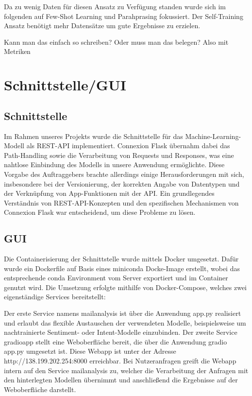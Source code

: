 Da zu wenig Daten für diesen Ansatz zu Verfügung standen wurde sich im folgenden auf Few-Shot
Learning und Parahprasing fokussiert. Der Self-Training Ansatz benötigt mehr Datensätze um
gute Ergebnisse zu erzielen.  

 

Kann man das einfach so schreiben? Oder muss man das belegen? Also mit Metriken 



\section{Schnittstelle/GUI}

\subsection{Schnittstelle}

Im Rahmen unseres Projekts wurde die Schnittstelle für das Machine-Learning-Modell als REST-API implementiert.
Connexion Flask übernahm dabei das Path-Handling sowie die Verarbeitung von Requests und Responses, was eine
nahtlose Einbindung des Modells in unsere Anwendung ermöglichte. Diese Vorgabe des Auftraggebers brachte
allerdings einige Herausforderungen mit sich, insbesondere bei der Versionierung, der korrekten Angabe
von Datentypen und der Verknüpfung von App-Funktionen mit der API. Ein grundlegendes Verständnis von
REST-API-Konzepten und den spezifischen Mechanismen von Connexion Flask war entscheidend, um diese Probleme
zu lösen. 

\subsection{GUI}

Die Containerisierung der Schnittstelle wurde mittels Docker umgesetzt. Dafür wurde ein
Dockerfile auf Basis eines miniconda Docke-Image erstellt, wobei das entsprechende conda
Environment vom Server exportiert und im Container genutzt wird. Die Umsetzung erfolgte mithilfe
von Docker-Compose, welches zwei eigenständige Services bereitstellt: 

Der erste Service namens mailanalysis ist über die Anwendung app.py realisiert und erlaubt
das flexible Austauschen der verwendeten Modelle, beispielsweise um nachtrainierte Sentiment-
oder Intent-Modelle einzubinden. Der zweite Service gradioapp stellt eine Weboberfläche bereit,
die über die Anwendung gradio app.py umgesetzt ist. Diese Webapp ist unter der
Adresse http://138.199.202.254:8000 erreichbar. Bei Nutzeranfragen greift die Webapp intern
auf den Service mailanalysis zu, welcher die Verarbeitung der Anfragen mit den hinterlegten
Modellen übernimmt und anschließend die Ergebnisse auf der Weboberfläche darstellt. 

